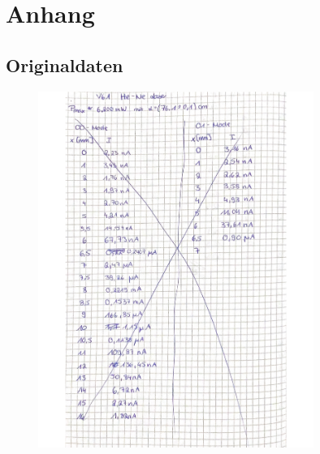 \section{Anhang}
\label{sec:Anhang}
\subsection{Originaldaten}

\begin{figure}[H]
  \centering
  \includegraphics[width=0.8\textwidth]{"Messwerte/V61Messdaten_01.pdf"}
  \label{fig:Messungen_1}
\end{figure}

